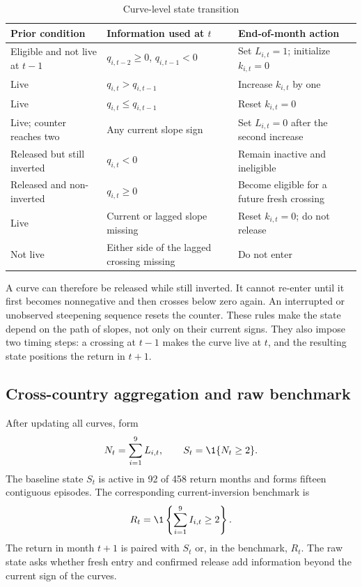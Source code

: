 \begin{table}[H]
\centering
\caption{Curve-level state transition}
\label{tab:signal-transition}
\small
\begin{tabularx}{\textwidth}{>{\raggedright\arraybackslash}p{3.3cm} >{\raggedright\arraybackslash}p{4.0cm} >{\raggedright\arraybackslash}X}
\toprule
Prior condition & Information used at $t$ & End-of-month action \\
\midrule
Eligible and not live at $t-1$ & $q_{i,t-2}\geq0$, $q_{i,t-1}<0$ & Set $L_{i,t}=1$; initialize $k_{i,t}=0$ \\
Live & $q_{i,t}>q_{i,t-1}$ & Increase $k_{i,t}$ by one \\
Live & $q_{i,t}\leq q_{i,t-1}$ & Reset $k_{i,t}=0$ \\
Live; counter reaches two & Any current slope sign & Set $L_{i,t}=0$ after the second increase \\
Released but still inverted & $q_{i,t}<0$ & Remain inactive and ineligible \\
Released and non-inverted & $q_{i,t}\geq0$ & Become eligible for a future fresh crossing \\
Live & Current or lagged slope missing & Reset $k_{i,t}=0$; do not release \\
Not live & Either side of the lagged crossing missing & Do not enter \\
\bottomrule
\end{tabularx}
\end{table}

A curve can therefore be released while still inverted. It cannot re-enter until it first becomes nonnegative and then crosses below zero again. An interrupted or unobserved steepening sequence resets the counter. These rules make the state depend on the path of slopes, not only on their current signs. They also impose two timing steps: a crossing at $t-1$ makes the curve live at $t$, and the resulting state positions the return in $t+1$.

\subsection{Cross-country aggregation and raw benchmark}

After updating all curves, form
\[
N_t=\sum_{i=1}^{9}L_{i,t},
\qquad
S_t=\1\{N_t\geq2\}.
\]
The baseline state $S_t$ is active in 92 of 458 return months and forms fifteen contiguous episodes. The corresponding current-inversion benchmark is
\[
R_t=\1\left\{\sum_{i=1}^{9}I_{i,t}\geq2\right\}.
\]
The return in month $t+1$ is paired with $S_t$ or, in the benchmark, $R_t$. The raw state asks whether fresh entry and confirmed release add information beyond the current sign of the curves.


